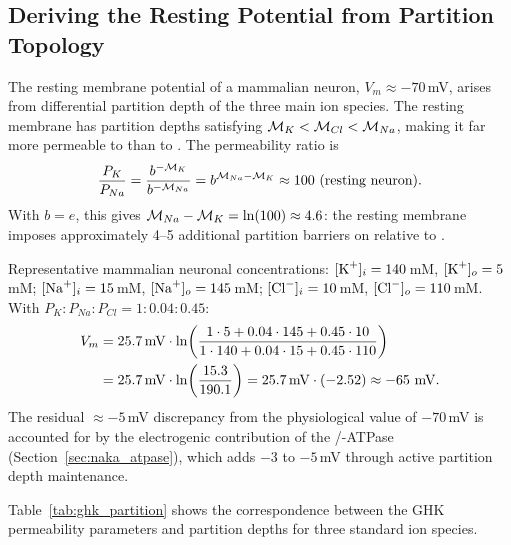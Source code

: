 \subsection{Deriving the Resting Potential from Partition Topology}
\label{ssec:resting_potential}

The resting membrane potential of a mammalian neuron, $V_m \approx -70$\,mV,
arises from differential partition depth of the three main ion species.
The resting membrane has partition depths satisfying
$\mathcal{M}_K < \mathcal{M}_{Cl} < \mathcal{M}_{Na}$,
making it far more permeable to  than to .
The permeability ratio is
\begin{equation}
  \frac{P_K}{P_{Na}}
    = \frac{b^{-\mathcal{M}_K}}{b^{-\mathcal{M}_{Na}}}
    = b^{\mathcal{M}_{Na} - \mathcal{M}_K} \approx 100\ \text{(resting neuron)}.
  \label{eq:permeability_ratio}
\end{equation}
With $b = e$, this gives $\mathcal{M}_{Na} - \mathcal{M}_K = \ln(100) \approx 4.6$:
the resting membrane imposes approximately 4--5 additional partition barriers
on  relative to .

\begin{example}
\label{ex:resting_potential}
Representative mammalian neuronal concentrations:
$[\ce{K+}]_i = 140$\,mM, $[\ce{K+}]_o = 5$\,mM;
$[\ce{Na+}]_i = 15$\,mM, $[\ce{Na+}]_o = 145$\,mM;
$[\ce{Cl-}]_i = 10$\,mM, $[\ce{Cl-}]_o = 110$\,mM.
With $P_K : P_{Na} : P_{Cl} = 1 : 0.04 : 0.45$:
\begin{align}
  V_m &= 25.7\,\mathrm{mV} \cdot \ln\!\left(
    \frac{1\cdot5 + 0.04\cdot145 + 0.45\cdot10}
         {1\cdot140 + 0.04\cdot15 + 0.45\cdot110}
  \right) \notag \\
  &= 25.7\,\mathrm{mV} \cdot \ln\!\left(\frac{15.3}{190.1}\right)
   = 25.7\,\mathrm{mV} \cdot (-2.52)
   \approx -65\ \mathrm{mV}.
\end{align}
The residual $\approx -5$\,mV discrepancy from the physiological value of
$-70$\,mV is accounted for by the electrogenic contribution of the
/-ATPase (Section~\ref{sec:naka_atpase}), which adds
$-3$ to $-5$\,mV through active partition depth maintenance.
\end{example}

Table~\ref{tab:ghk_partition} shows the correspondence between the GHK
permeability parameters and partition depths for three standard ion species.


